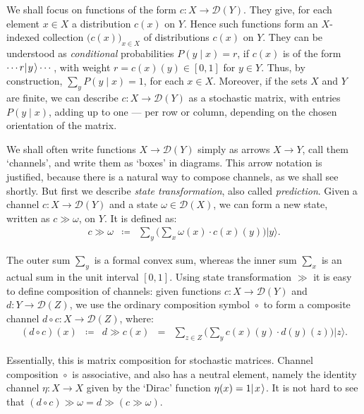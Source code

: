 \documentclass{mscs}
\newcommand{\after}{\mathrel{\circ}}
\newcommand{\Dst}{\mathcal{D}}
\newcommand{\ket}[1]{\ensuremath{|{\kern.1em}#1{\kern.1em}\rangle}}
\newcommand{\bigket}[1]{\ensuremath{\big|#1\big\rangle}}
\begin{document}
We shall focus on functions of the form $c\colon X \rightarrow
\Dst(Y)$.  They give, for each element $x\in X$ a distribution $c(x)$
on $Y$. Hence such functions form an $X$-indexed collection
$\big(c(x)\big)_{x\in X}$ of distributions $c(x)$ on $Y$. They can be
understood as \emph{conditional} probabilities $P(y\mid x) = r$, if
$c(x)$ is of the form $\cdots r\ket{y}\cdots$, with weight $r =
c(x)(y)\in[0,1]$ for $y\in Y$.  Thus, by construction, $\sum_{y}
P(y\mid x) = 1$, for each $x\in X$.  Moreover, if the sets $X$ and $Y$
are finite, we can describe $c\colon X \rightarrow \Dst(Y)$ as a
stochastic matrix, with entries $P(y\mid x)$, adding up to one --- per
row or column, depending on the chosen orientation of the matrix.

We shall often write functions $X \rightarrow \Dst(Y)$ simply as
arrows $X \rightarrow Y$, call them `channels', and write them as
`boxes' in diagrams. This arrow notation is justified, because there
is a natural way to compose channels, as we shall see shortly.  But
first we describe \emph{state transformation}, also called
\emph{prediction}. Given a channel $c\colon X \rightarrow \Dst(Y)$ and
a state $\omega\in\Dst(X)$, we can form a new state, written as $c \gg
\omega$, on $Y$. It is defined as:
\begin{equation}
\label{eqn:discstatransf}
\begin{array}{rcl}
c \gg \omega
& \coloneqq &
{\displaystyle\sum_y} \big(\sum_{x} \omega(x)\cdot c(x)(y)\big)\bigket{y}.
\end{array}
\end{equation}

\noindent The outer sum $\sum_{y}$ is a formal convex sum, whereas the
inner sum $\sum_{x}$ is an actual sum in the unit interval $[0,1]$.
Using state transformation $\gg$ it is easy to define composition of
channels: given functions $c\colon X \rightarrow \Dst(Y)$ and $d\colon
Y \rightarrow \Dst(Z)$, we use the ordinary composition symbol
$\after$ to form a composite channel $d \after c \colon X \rightarrow
\Dst(Z)$, where:
\begin{equation}
\label{eqn:discretecomposition}
\begin{array}{rcccl}
(d \after c)(x)
& \coloneqq &
d \gg c(x)
& = &
{\displaystyle\sum_{z\in Z}} \big(\sum_{y} c(x)(y)\cdot d(y)(z)\big)
   \bigket{z}.
\end{array}
\end{equation}

\noindent Essentially, this is matrix composition for stochastic
matrices. Channel composition $\after$ is associative, and also has a
neutral element, namely the identity channel $\eta \colon X
\rightarrow X$ given by the `Dirac' function $\eta(x) = 1\ket{x}$.  It
is not hard to see that $(d \after c) \gg \omega = d \gg (c \gg
\omega)$.
\end{document}
